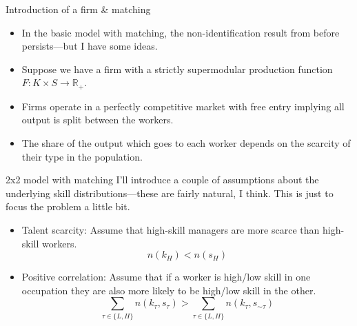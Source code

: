 \documentclass[aspectratio=169]{beamer}
\begin{document}
\begin{frame}{Introduction of a firm \& matching}
	\begin{itemize}
		\item In the basic model with matching, the non-identification result from before persists---but I have some ideas.
		\bigskip
		\item Suppose we have a firm with a strictly supermodular production function $F:K\times S \to \mathbb{R}_+$.
		\bigskip
		\item Firms operate in a perfectly competitive market with free entry implying all output is split between the workers.
		\bigskip
		\item The share of the output which goes to each worker depends on the scarcity of their type in the population.
	\end{itemize}
\end{frame}

\begin{frame}{2x2 model with matching}
		 I'll introduce a couple of assumptions about the underlying skill distributions---these are fairly natural, I think. This is just to focus the problem a little bit.
 
 		\bigskip
 
		\begin{itemize}
			\item Talent scarcity: Assume that high-skill managers are more scarce than high-skill workers.
			\begin{equation*}
				n(k_H) < n(s_H)
			\end{equation*}
			\item Positive correlation: Assume that if a worker is high/low skill in one occupation they are also more likely to be high/low skill in the other.
			\begin{equation*}
				\sum_{\tau \in \{L,H\}}n(k_\tau,s_\tau) > \sum_{\tau \in \{L,H\}}n(k_\tau,s_{\sim\tau})
			\end{equation*}
		\end{itemize}

\end{frame}

		
\end{document}
